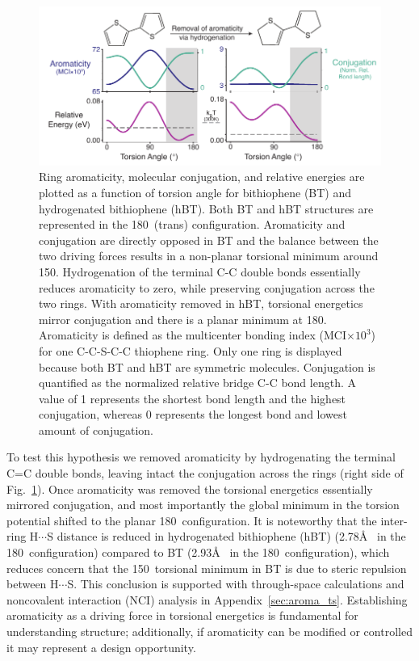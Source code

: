 \begin{figure}[hbt!]
    \centering
    \includegraphics{figures/chap3/fig1_d2.pdf}
    \caption{Ring aromaticity, molecular conjugation, and relative energies are plotted as a function of torsion angle for bithiophene (BT) and hydrogenated bithiophene (hBT). Both BT and hBT structures are represented in the 180\textdegree \ (trans) configuration. Aromaticity and conjugation are directly opposed in BT and the balance between the two driving forces results in a non-planar torsional minimum around 150\textdegree. Hydrogenation of the terminal C-C double bonds essentially reduces aromaticity to zero, while preserving conjugation across the two rings. With aromaticity removed in hBT, torsional energetics mirror conjugation and there is a planar minimum at 180\textdegree. Aromaticity is defined as the multicenter bonding index (MCI$\times 10^3$) for one C-C-S-C-C thiophene ring. Only one ring is displayed because both BT and hBT are symmetric molecules. Conjugation is quantified as the normalized relative bridge C-C bond length. A value of 1 represents the shortest bond length and the highest conjugation, whereas 0 represents the longest bond and lowest amount of conjugation.}
    \label{fig:a_vs_c}
\end{figure}

To test this hypothesis we removed aromaticity by hydrogenating the terminal C=C double bonds, leaving intact the conjugation across the rings (right side of Fig.~\ref{fig:a_vs_c}). Once aromaticity was removed the torsional energetics essentially mirrored conjugation, and most importantly the global minimum in the torsion potential shifted to the planar 180\textdegree \ configuration. It is noteworthy that the inter-ring H$\cdots$S distance is reduced in hydrogenated bithiophene (hBT) (2.78\si{\angstrom} \ in the 180\textdegree \ configuration) compared to BT (2.93\si{\angstrom} \ in the 180\textdegree \ configuration), which reduces concern that the 150\textdegree \ torsional minimum in BT is due to steric repulsion between H$\cdots$S. This conclusion is supported with through-space calculations and noncovalent interaction (NCI) analysis\cite{Johnson2010, Contreras-Garcia2011} in Appendix~\ref{sec:aroma_ts}. Establishing aromaticity as a driving force in torsional energetics is fundamental for understanding structure; additionally, if aromaticity can be modified or controlled it may represent a design opportunity.

